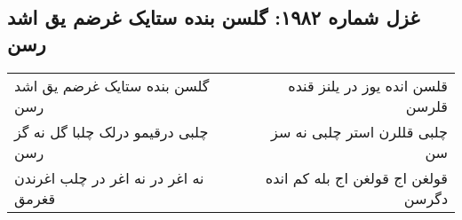 \begin{center}
\section*{غزل شماره ۱۹۸۲: گلسن بنده ستایک غرضم یق اشد رسن}
\label{sec:1982}
\begin{longtable}{l p{0.5cm} r}
گلسن بنده ستایک غرضم یق اشد رسن
&&
قلسن انده یوز در یلنز قنده قلرسن
\\
چلبی درقیمو درلک چلبا گل نه گز رسن
&&
چلبی قللرن استر چلبی نه سز سن
\\
نه اغر در نه اغر در چلب اغرندن قغرمق
&&
قولغن اج قولغن اج بله کم انده دگرسن
\\
\end{longtable}
\end{center}
